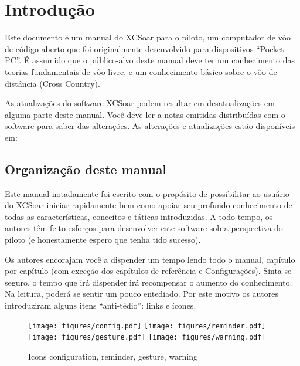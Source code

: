 \chapter{Introdução}\label{cha:introduction}
Este documento é um manual do XCSoar para o piloto, um computador de vôo de código aberto que foi originalmente desenvolvido para dispositivos “Pocket PC”.  É assumido que o público-alvo deste manual deve ter um conhecimento das teorias fundamentais de vôo livre, e um conhecimento básico sobre o vôo de distância (Cross Country).

As atualizações do software XCSoar podem resultar em desatualizações em alguma parte deste manual.   Você deve ler a notas emitidas distribuídas com o software para saber das alterações.  As alterações e atualizações estão disponíveis em:  
\begin{quote}
\xcsoarwebsite{}
\end{quote}

\section{Organização deste manual}

Este manual notadamente foi escrito com o propósito de possibilitar ao usuário do XCSoar iniciar rapidamente bem como apoiar seu profundo conhecimento de todas as características, conceitos e táticas introduzidas.  A todo tempo, os autores têm feito esforços para desenvolver este software sob a perspectiva do piloto (e honestamente espero que tenha tido sucesso).

Os autores encorajam você a dispender um tempo lendo todo o manual, capítulo por capítulo (com exceção dos capítulos de referência e Configurações).  Sinta-se seguro, o tempo que irá dispender irá recompensar o aumento do conhecimento.  Na leitura, poderá se sentir um pouco entediado.  Por este motivo os autores introduziram alguns itens “anti-tédio”: links e ícones.

\begin{figure}[h]
\centering
\texttt{[image: figures/config.pdf]}
\hspace{1.5cm}
\texttt{[image: figures/reminder.pdf]}
\hspace{1.5cm}
\texttt{[image: figures/gesture.pdf]}
\hspace{1.5cm}
\texttt{[image: figures/warning.pdf]}
\caption{Icons configuration, reminder, gesture, warning}
\end{figure}

